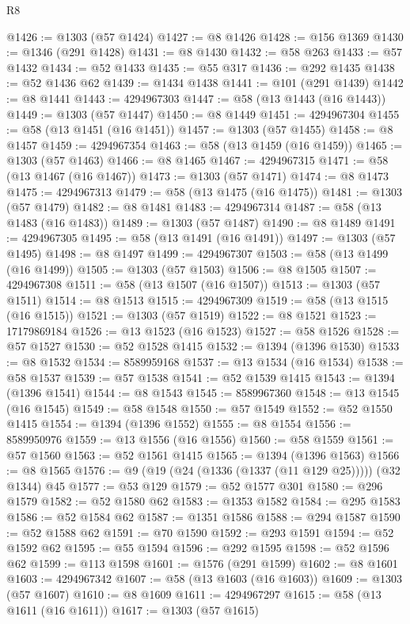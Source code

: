 \begin{lexlean}{R8}
\begin{coremodule}
@1426 := @1303 (@57 @1424)
@1427 := @8 @1426
@1428 := @156 @1369
@1430 := @1346 (@291 @1428)
@1431 := @8 @1430
@1432 := @58 @263
@1433 := @57 @1432
@1434 := @52 @1433
@1435 := @55 @317
@1436 := @292 @1435
@1438 := @52 @1436 @62
@1439 := @1434 @1438
@1441 := @101 (@291 @1439)
@1442 := @8 @1441
@1443 := 4294967303
@1447 := @58 (@13 @1443 (@16 @1443))
@1449 := @1303 (@57 @1447)
@1450 := @8 @1449
@1451 := 4294967304
@1455 := @58 (@13 @1451 (@16 @1451))
@1457 := @1303 (@57 @1455)
@1458 := @8 @1457
@1459 := 4294967354
@1463 := @58 (@13 @1459 (@16 @1459))
@1465 := @1303 (@57 @1463)
@1466 := @8 @1465
@1467 := 4294967315
@1471 := @58 (@13 @1467 (@16 @1467))
@1473 := @1303 (@57 @1471)
@1474 := @8 @1473
@1475 := 4294967313
@1479 := @58 (@13 @1475 (@16 @1475))
@1481 := @1303 (@57 @1479)
@1482 := @8 @1481
@1483 := 4294967314
@1487 := @58 (@13 @1483 (@16 @1483))
@1489 := @1303 (@57 @1487)
@1490 := @8 @1489
@1491 := 4294967305
@1495 := @58 (@13 @1491 (@16 @1491))
@1497 := @1303 (@57 @1495)
@1498 := @8 @1497
@1499 := 4294967307
@1503 := @58 (@13 @1499 (@16 @1499))
@1505 := @1303 (@57 @1503)
@1506 := @8 @1505
@1507 := 4294967308
@1511 := @58 (@13 @1507 (@16 @1507))
@1513 := @1303 (@57 @1511)
@1514 := @8 @1513
@1515 := 4294967309
@1519 := @58 (@13 @1515 (@16 @1515))
@1521 := @1303 (@57 @1519)
@1522 := @8 @1521
@1523 := 17179869184
@1526 := @13 @1523 (@16 @1523)
@1527 := @58 @1526
@1528 := @57 @1527
@1530 := @52 @1528 @1415
@1532 := @1394 (@1396 @1530)
@1533 := @8 @1532
@1534 := 8589959168
@1537 := @13 @1534 (@16 @1534)
@1538 := @58 @1537
@1539 := @57 @1538
@1541 := @52 @1539 @1415
@1543 := @1394 (@1396 @1541)
@1544 := @8 @1543
@1545 := 8589967360
@1548 := @13 @1545 (@16 @1545)
@1549 := @58 @1548
@1550 := @57 @1549
@1552 := @52 @1550 @1415
@1554 := @1394 (@1396 @1552)
@1555 := @8 @1554
@1556 := 8589950976
@1559 := @13 @1556 (@16 @1556)
@1560 := @58 @1559
@1561 := @57 @1560
@1563 := @52 @1561 @1415
@1565 := @1394 (@1396 @1563)
@1566 := @8 @1565
@1576 := @9 (@19 (@24 (@1336 (@1337 (@11 @129 @25))))) (@32 @1344) @45
@1577 := @53 @129
@1579 := @52 @1577 @301
@1580 := @296 @1579
@1582 := @52 @1580 @62
@1583 := @1353 @1582
@1584 := @295 @1583
@1586 := @52 @1584 @62
@1587 := @1351 @1586
@1588 := @294 @1587
@1590 := @52 @1588 @62
@1591 := @70 @1590
@1592 := @293 @1591
@1594 := @52 @1592 @62
@1595 := @55 @1594
@1596 := @292 @1595
@1598 := @52 @1596 @62
@1599 := @113 @1598
@1601 := @1576 (@291 @1599)
@1602 := @8 @1601
@1603 := 4294967342
@1607 := @58 (@13 @1603 (@16 @1603))
@1609 := @1303 (@57 @1607)
@1610 := @8 @1609
@1611 := 4294967297
@1615 := @58 (@13 @1611 (@16 @1611))
@1617 := @1303 (@57 @1615)

\end{coremodule}
\end{lexlean}
